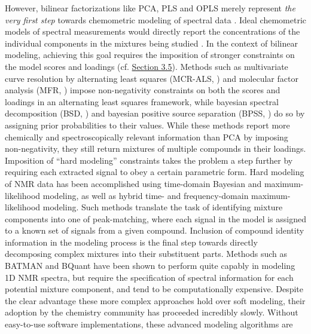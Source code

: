 \begin{doublespace}
However, bilinear factorizations like PCA, PLS and OPLS merely represent
\emph{the very first step} towards chemometric modeling of spectral data
\cite{gromski:aca2015}. Ideal chemometric models of spectral measurements
would directly report the concentrations of the individual components in
the mixtures being studied \cite{eads:anchem2004}. In the context of bilinear
modeling, achieving this goal requires the imposition of stronger constraints
on the model scores and loadings (cf. \hyperlink{section.3.5}{Section 3.5}).
Methods such as multivariate curve resolution by alternating least squares
(MCR-ALS, \cite{dejuan:crac2006}) and molecular factor analysis
(MFR, \cite{eads:anchem2004}) impose non-negativity constraints on both
the scores and loadings in an alternating least squares framework, while
bayesian spectral decomposition (BSD, \cite{ochs:jmr1999,stoyanova:anchem2004})
and bayesian positive source separation (BPSS, \cite{moussaoui:ieee2006,
  moussaoui:cils2006}) do so by assigning prior
probabilities to their values. While these methods report more chemically
and spectroscopically relevant information than PCA by imposing non-negativity,
they still return mixtures of multiple compounds in their loadings. Imposition
of ``hard modeling'' constraints takes the problem a step further by requiring
each extracted signal to obey a certain parametric form. Hard modeling of NMR
data has been accomplished using time-domain Bayesian
\cite{bretthorst:jmr1990a,bretthorst:jmr1990b,bretthorst:jmr1990c,
      chylla:jbnmr1993} and maximum-likelihood \cite{chylla:jbnmr1995}
modeling, as well as hybrid time- and frequency-domain maximum-likelihood
\cite{chylla:jbnmr1998,chylla:anchem2011,hu:anchem2011} modeling. Such
methods translate the task of identifying mixture components into one of
peak-matching, where each signal in the model is assigned to a known set
of signals from a given compound. Inclusion of compound identity information
in the modeling process is the final step towards directly decomposing complex
mixtures into their substituent parts. Methods such as BATMAN
\cite{astle:jasa2012,hao:binf2012} and BQuant \cite{zheng:binf2011} have
been shown to perform quite capably in modeling 1D \hnmr{} NMR spectra, but
require the specification of spectral information for each potential mixture
component, and tend to be computationally expensive. Despite the clear
advantage these more complex approaches hold over soft modeling, their
adoption by the chemistry community has proceeded incredibly slowly. Without
easy-to-use software implementations, these advanced modeling algorithms are

\end{doublespace}
